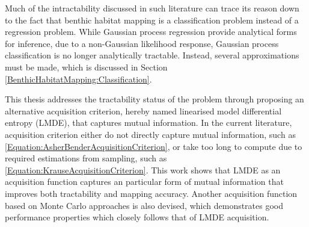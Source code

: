 			Much of the intractability discussed in such literature can trace its reason down to the fact that benthic habitat mapping is a classification problem instead of a regression problem. While Gaussian process regression provide analytical forms for inference, due to a non-Gaussian likelihood response, Gaussian process classification is no longer analytically tractable. Instead, several approximations must be made, which is discussed in Section \ref{BenthicHabitatMapping:Classification}.
			
			This thesis addresses the tractability status of the problem through proposing an alternative acquisition criterion, hereby named linearised model differential entropy (LMDE), that captures mutual information. In the current literature, acquisition criterion either do not directly capture mutual information, such as \eqref{Equation:AsherBenderAcquisitionCriterion}, or take too long to compute due to required estimations from sampling, such as \eqref{Equation:KrauseAcquisitionCriterion}. This work shows that LMDE as an acquisition function captures an particular form of mutual information that improves both tractability and mapping accuracy. Another acquisition function based on Monte Carlo approaches is also devised, which demonstrates good performance properties which closely follows that of LMDE acquisition.